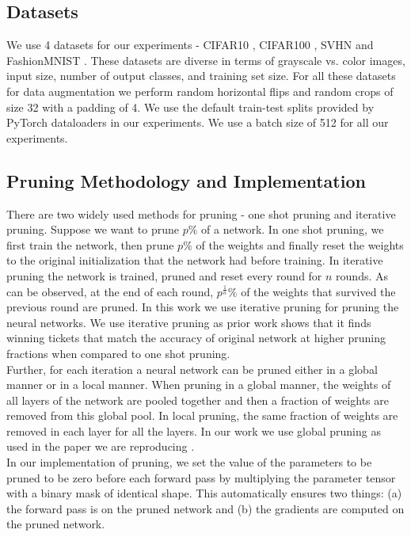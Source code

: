    \subsection{Datasets}
    We use 4 datasets for our experiments - CIFAR10 \cite{cifar}, CIFAR100 \cite{cifar}, SVHN \cite{svhn} and FashionMNIST \cite{fashionmnist}. These datasets are diverse in terms of grayscale vs. color images, input size, number of output classes,
    and training set size. For all these datasets for data augmentation we perform random horizontal flips and random crops of size 32 with a padding of 4. We use the default train-test splits provided by PyTorch dataloaders in our experiments. We use a batch size of 512 for all our experiments. 
    
    
    \subsection{Pruning Methodology and Implementation}
    There are two widely used methods for pruning - one shot pruning and iterative pruning. Suppose we want to prune $p\%$ of a network.  In one shot pruning, we first train the network, then prune $p\%$ of the weights and finally reset the weights to the original initialization that the network had before training. In iterative pruning the network is trained, pruned and reset every round for $n$ rounds. As can be observed, at the end of each round, $p^{\frac{1}{n}} \%$ of the weights that survived the previous round are pruned. In this work we use iterative pruning for pruning the neural networks.  We use iterative pruning as prior work \cite{lth_orig_paper} shows that it finds winning tickets that match the accuracy of original network at higher pruning fractions when compared to one shot pruning.\\
    
    Further, for each iteration a neural network can be pruned either in a global manner or in a local manner. When pruning in a global manner, the weights of all layers of the network are pooled together and then a fraction of weights are removed from this global pool. In local pruning, the same fraction of weights are removed in each layer for all the layers. In our work we use global pruning as used in the paper we are reproducing \cite{repro_paper}.\\
    
    In our implementation of pruning,  we set the value of the parameters to be pruned to be zero before each forward pass by multiplying the parameter tensor with a binary mask of identical shape. This automatically ensures two things: (a) the forward pass is on the pruned network and (b) the gradients are computed on the pruned network. \\
    
